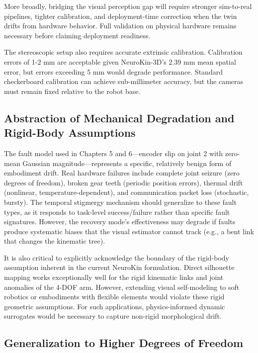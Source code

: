 \documentclass[12pt,a4paper,oneside]{report}
\begin{document}
More broadly, bridging the visual perception gap will require stronger sim-to-real pipelines, tighter calibration, and deployment-time correction when the twin drifts from hardware behavior. Full validation on physical hardware remains necessary before claiming deployment readiness.

The stereoscopic setup also requires accurate extrinsic calibration. Calibration errors of 1-2 mm are acceptable given NeuroKin-3D's 2.39 mm mean spatial error, but errors exceeding 5 mm would degrade performance. Standard checkerboard calibration can achieve sub-millimeter accuracy, but the cameras must remain fixed relative to the robot base.

\subsection{Abstraction of Mechanical Degradation and Rigid-Body Assumptions}

The fault model used in Chapters 5 and 6---encoder slip on joint 2 with zero-mean Gaussian magnitude---represents a specific, relatively benign form of embodiment drift. Real hardware failures include complete joint seizure (zero degrees of freedom), broken gear teeth (periodic position errors), thermal drift (nonlinear, temperature-dependent), and communication packet loss (stochastic, bursty). The temporal stigmergy mechanism should generalize to these fault types, as it responds to task-level success/failure rather than specific fault signatures. However, the recovery mode's effectiveness may degrade if faults produce systematic biases that the visual estimator cannot track (e.g., a bent link that changes the kinematic tree).

It is also critical to explicitly acknowledge the boundary of the rigid-body assumption inherent in the current NeuroKin formulation. Direct silhouette mapping works exceptionally well for the rigid kinematic links and joint anomalies of the 4-DOF arm. However, extending visual self-modeling to soft robotics or embodiments with flexible elements would violate these rigid geometric assumptions. For such applications, physics-informed dynamic surrogates would be necessary to capture non-rigid morphological drift.

\subsection{Generalization to Higher Degrees of Freedom}
\end{document}
